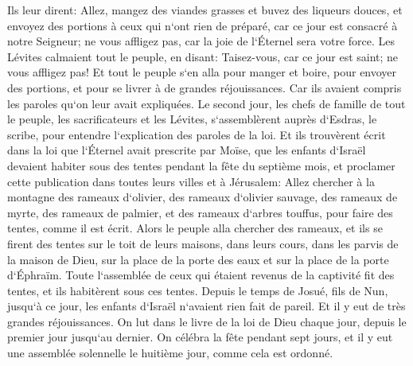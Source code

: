 \verse Ils leur dirent: Allez, mangez des viandes grasses et buvez des liqueurs douces, et envoyez des portions à ceux qui n`ont rien de préparé, car ce jour est consacré à notre Seigneur; ne vous affligez pas, car la joie de l`Éternel sera votre force. 
\verse Les Lévites calmaient tout le peuple, en disant: Taisez-vous, car ce jour est saint; ne vous affligez pas! 
\verse Et tout le peuple s`en alla pour manger et boire, pour envoyer des portions, et pour se livrer à de grandes réjouissances. Car ils avaient compris les paroles qu`on leur avait expliquées. 
\verse Le second jour, les chefs de famille de tout le peuple, les sacrificateurs et les Lévites, s`assemblèrent auprès d`Esdras, le scribe, pour entendre l`explication des paroles de la loi. 
\verse Et ils trouvèrent écrit dans la loi que l`Éternel avait prescrite par Moïse, que les enfants d`Israël devaient habiter sous des tentes pendant la fête du septième mois, 
\verse et proclamer cette publication dans toutes leurs villes et à Jérusalem: Allez chercher à la montagne des rameaux d`olivier, des rameaux d`olivier sauvage, des rameaux de myrte, des rameaux de palmier, et des rameaux d`arbres touffus, pour faire des tentes, comme il est écrit. 
\verse Alors le peuple alla chercher des rameaux, et ils se firent des tentes sur le toit de leurs maisons, dans leurs cours, dans les parvis de la maison de Dieu, sur la place de la porte des eaux et sur la place de la porte d`Éphraïm. 
\verse Toute l`assemblée de ceux qui étaient revenus de la captivité fit des tentes, et ils habitèrent sous ces tentes. Depuis le temps de Josué, fils de Nun, jusqu`à ce jour, les enfants d`Israël n`avaient rien fait de pareil. Et il y eut de très grandes réjouissances. 
\verse On lut dans le livre de la loi de Dieu chaque jour, depuis le premier jour jusqu`au dernier. On célébra la fête pendant sept jours, et il y eut une assemblée solennelle le huitième jour, comme cela est ordonné. 

